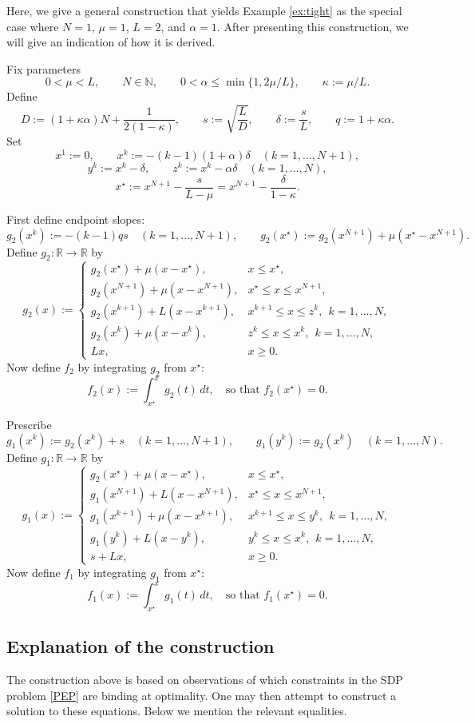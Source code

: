 \documentclass{article} %
\newcommand{\R}{{\mathbb R}}
\begin{document}
{
Here, we give a general construction that yields Example \ref{ex:tight} as the special case where $N=1$, $\mu =1$, $L =2$, and $\alpha =1$. After presenting this construction, we will give an indication of how it is derived.

Fix parameters
\[
0<\mu<L,\qquad N\in\mathbb{N},\qquad 0<\alpha\le \min\{1,2\mu/L\},\qquad \kappa:=\mu/L.
\]
Define
\[
D:=(1+\kappa\alpha)N+\frac{1}{2(1-\kappa)},\qquad
s:=\sqrt{\frac{L}{D}},\qquad
\delta:=\frac{s}{L},\qquad
q:=1+\kappa\alpha.
\]
Set
\[
x^1:=0,\qquad x^k:=-(k-1)(1+\alpha)\delta\quad (k=1,\dots,N+1),
\]
\[
y^k:=x^k-\delta,\qquad z^k:=x^k-\alpha\delta\quad (k=1,\dots,N),
\]
\[
x^\star:=x^{N+1}-\frac{s}{L-\mu}=x^{N+1}-\frac{\delta}{1-\kappa}.
\]

First define endpoint slopes:
\[
g_2(x^k):=-(k-1)qs\quad (k=1,\dots,N+1),
\qquad
g_2(x^\star):=g_2(x^{N+1})+\mu(x^\star-x^{N+1}).
\]
Define $g_2:\R\to\R$ by
\[
g_2(x):=
\begin{cases}
g_2(x^\star)+\mu(x-x^\star), & x\le x^\star,\\[1mm]
g_2(x^{N+1})+\mu(x-x^{N+1}), & x^\star\le x\le x^{N+1},\\[1mm]
g_2(x^{k+1})+L(x-x^{k+1}), & x^{k+1}\le x\le z^k,\ \ k=1,\dots,N,\\[1mm]
g_2(x^{k})+\mu(x-x^{k}), & z^k\le x\le x^k,\ \ k=1,\dots,N,\\[1mm]
Lx, & x\ge 0.
\end{cases}
\]
Now define $f_2$ by integrating $g_2$ from $x^\star$:
\[
f_2(x):=\int_{x^\star}^{x} g_2(t)\,dt,
\quad\text{so that } f_2(x^\star)=0.
\]


Prescribe
\[
g_1(x^k):=g_2(x^k)+s\quad (k=1,\dots,N+1),
\qquad
g_1(y^k):=g_2(x^k)\quad (k=1,\dots,N).
\]
Define $g_1:\R\to\R$ by
\[
g_1(x):=
\begin{cases}
g_2(x^\star)+\mu(x-x^\star), & x\le x^\star,\\[1mm]
g_1(x^{N+1})+L(x-x^{N+1}), & x^\star\le x\le x^{N+1},\\[1mm]
g_1(x^{k+1})+\mu(x-x^{k+1}), & x^{k+1}\le x\le y^k,\ \ k=1,\dots,N,\\[1mm]
g_1(y^{k})+L(x-y^{k}), & y^k\le x\le x^k,\ \ k=1,\dots,N,\\[1mm]
s+Lx, & x\ge 0.
\end{cases}
\]
Now define $f_1$ by integrating $g_1$ from $x^\star$:
\[
f_1(x):=\int_{x^\star}^{x} g_1(t)\,dt,
\quad\text{so that } f_1(x^\star)=0.
\]

\subsection*{Explanation of the construction}
The construction above is based on 
observations of which constraints in the SDP problem \eqref{PEP} are binding at optimality. One may then attempt to construct a solution to these equations.
Below we mention the relevant equalities.


}
\end{document}
